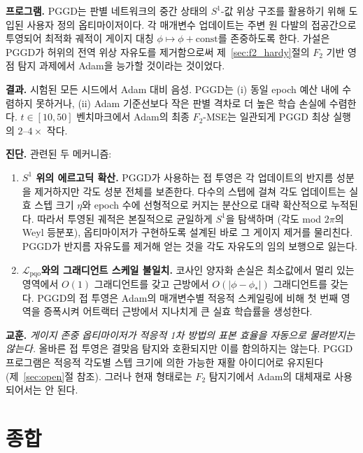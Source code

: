 \documentclass[11pt, a4paper]{article}
\theoremstyle{definition}
\theoremstyle{plain}
\newcommand{\Lpqo}{\mathcal{L}_{\mathrm{pqo}}}
\begin{document}
\textbf{프로그램.} PGGD는 판별 네트워크의 중간 상태의 $S^1$-값 위상 구조를 활용하기 위해 도입된 사용자 정의 옵티마이저이다. 각 매개변수 업데이트는 주변 원 다발의 접공간으로 투영되어 최적화 궤적이 게이지 대칭 $\phi\mapsto\phi+\mathrm{const}$를 존중하도록 한다. 가설은 PGGD가 허위의 전역 위상 자유도를 제거함으로써 제~\ref{sec:f2_hardy}절의 $F_2$ 기반 영점 탐지 과제에서 Adam을 능가할 것이라는 것이었다.

\textbf{결과.} 시험된 모든 시드에서 Adam 대비 음성. PGGD는 (i) 동일 epoch 예산 내에 수렴하지 못하거나, (ii) Adam 기준선보다 작은 판별 격차로 더 높은 학습 손실에 수렴한다. $t\in[10,50]$ 벤치마크에서 Adam의 최종 $F_2$-MSE는 일관되게 PGGD 최상 실행의 $2$--$4\times$ 작다.

\textbf{진단.} 관련된 두 메커니즘:
\begin{enumerate}
  \item \textbf{$S^1$ 위의 에르고딕 확산.} PGGD가 사용하는 접 투영은 각 업데이트의 반지름 성분을 제거하지만 각도 성분 전체를 보존한다. 다수의 스텝에 걸쳐 각도 업데이트는 실효 스텝 크기 $\eta$와 epoch 수에 선형적으로 커지는 분산으로 대략 확산적으로 누적된다. 따라서 투영된 궤적은 본질적으로 균일하게 $S^1$을 탐색하며 (각도 mod $2\pi$의 Weyl 등분포), 옵티마이저가 구현하도록 설계된 바로 그 게이지 제거를 물리친다. PGGD가 반지름 자유도를 제거해 얻는 것을 각도 자유도의 임의 보행으로 잃는다.
  \item \textbf{$\Lpqo$와의 그래디언트 스케일 불일치.} 코사인 양자화 손실은 최소값에서 멀리 있는 영역에서 $O(1)$ 그래디언트를 갖고 근방에서 $O(|\phi-\phi_*|)$ 그래디언트를 갖는다. PGGD의 접 투영은 Adam의 매개변수별 적응적 스케일링에 비해 첫 번째 영역을 증폭시켜 어트랙터 근방에서 지나치게 큰 실효 학습률을 생성한다.
\end{enumerate}

\textbf{교훈.} \emph{게이지 존중 옵티마이저가 적응적 1차 방법의 표본 효율을 자동으로 물려받지는 않는다.} 올바른 접 투영은 결맞음 탐지와 호환되지만 이를 함의하지는 않는다. PGGD 프로그램은 적응적 각도별 스텝 크기에 의한 가능한 재활 아이디어로 유지된다 (제~\ref{sec:open}절 참조). 그러나 현재 형태로는 $F_2$ 탐지기에서 Adam의 대체재로 사용되어서는 안 된다.



\part{종합}
\label{part:synthesis}
\end{document}
